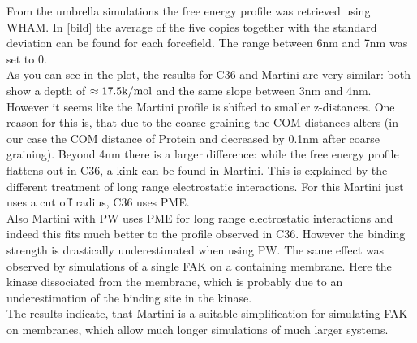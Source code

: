 From the umbrella simulations the free energy profile was retrieved using \gromacs{} WHAM. In \autoref{bild} the average of the five copies together with the standard deviation can be found for each forcefield. The range between 6$\si{\nano\metre}$ and 7$\si{\nano\metre}$ was set to 0.\\
As you can see in the plot, the results for C36 and Martini are very similar: both show a depth of $\approx 17.5 \si{\kilo\cal/\mole}$ and the same slope between 3$\si{\nano\metre}$ and 4$\si{\nano\metre}$. However it seems like the Martini profile is shifted to smaller z-distances. One reason for this is, that due to the coarse graining the COM distances alters (in our case the COM distance of Protein and \pip{} decreased by 0.1$\si{\nano\metre}$ after coarse graining). Beyond 4$\si{\nano\metre}$ there is a larger difference: while the free energy profile flattens out in C36, a kink can be found in Martini. This is explained by the different treatment of long range electrostatic interactions. For this Martini just uses a cut off radius, C36 uses PME.\\
Also Martini with PW uses PME for long range electrostatic interactions and indeed this fits much better to the profile observed in C36. However the binding strength is drastically underestimated when using PW. The same effect was observed by simulations of a single FAK on a \pip{} containing membrane. Here the kinase dissociated from the membrane, which is probably due to an underestimation of the \pip{} binding site in the kinase.\\
The results indicate, that Martini is a suitable simplification for simulating FAK on membranes, which allow much longer simulations of much larger systems.